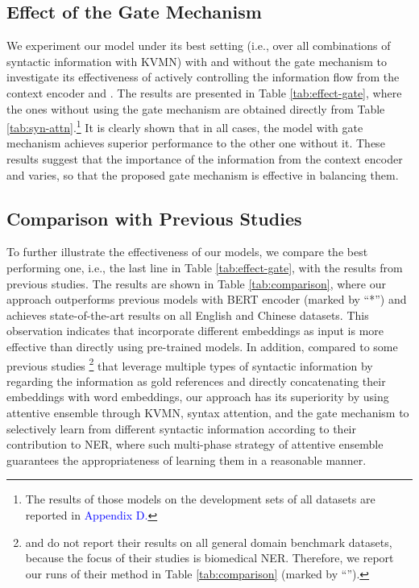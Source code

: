 \documentclass[11pt,a4paper]{article}
\begin{document}
\subsection{Effect of the Gate Mechanism}





We experiment our model under its best setting (i.e.,  over all combinations of syntactic information with KVMN) with and without the gate mechanism to investigate its effectiveness of actively controlling the information flow from the context encoder and .
The results 
are presented in
Table \ref{tab:effect-gate}, where the ones without using the gate mechanism are obtained directly from Table \ref{tab:syn-attn}.\footnote{The results of those models on the development sets of all datasets are reported in \textcolor{blue}{Appendix D.}}
It is clearly shown that in all cases, the model with gate mechanism 
achieves superior performance to the other one without it.
These results suggest that the importance of the information from the context encoder and  varies, so that the proposed gate mechanism is effective in balancing them.




\subsection{Comparison with Previous Studies}
\label{sec: comp}




To further illustrate the effectiveness of our models,
we compare the best performing one, i.e., the last line in Table \ref{tab:effect-gate}, with the results from previous studies.
The results are shown in Table \ref{tab:comparison}, where 
our approach outperforms previous models with BERT encoder (marked by ``*'')
and achieves state-of-the-art results on all English and Chinese datasets.
This observation indicates that incorporate different embeddings as input is more effective than directly using pre-trained models.
In addition,
compared to some previous studies \cite{DBLP:journals/bioinformatics/LuoYYZWLW18,DBLP:journals/bioinformatics/DangLNV18}\footnote{\citet{DBLP:journals/bioinformatics/LuoYYZWLW18} and \citet{DBLP:journals/bioinformatics/DangLNV18} do not report their results on all general domain benchmark datasets, because the focus of their studies is biomedical NER.
Therefore, we report our runs of their method in Table \ref{tab:comparison} (marked by ``'').}
that leverage multiple types of syntactic information
by regarding the information as gold references and directly concatenating their embeddings with word embeddings,
our approach has its superiority by using attentive ensemble through KVMN, syntax attention, and the gate mechanism to selectively learn from different syntactic information according to their contribution to NER, where such multi-phase strategy of attentive ensemble guarantees the appropriateness of learning them in a reasonable manner.
\end{document}
